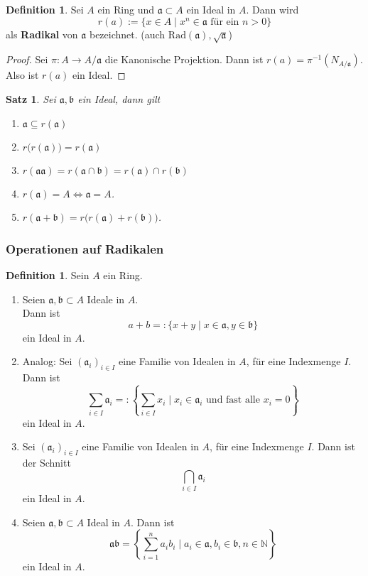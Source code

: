 \documentclass[10pt,a4paper]{article}
\newcommand{\N}{\ensuremath{\mathbb{N}}}
\theoremstyle{plain}
\newtheorem{satz}[theorem]{Satz}
\theoremstyle{definition}
\newtheorem{definition}[theorem]{Definition}
\theoremstyle{remark}
\begin{document}
	\begin{definition}
		Sei $A$ ein Ring und $\mathfrak a\subset A$ ein Ideal in $A$. Dann wird
		\[r(a):=\{x\in A\mid \text{$x^n\in \mathfrak a$ für ein $n>0$}\}\]
		als \textbf{Radikal} von $\mathfrak a$ bezeichnet. (auch $\mathrm{Rad}(\mathfrak a),\sqrt{\mathfrak a}$)
	\end{definition}
	\begin{proof}
		Sei $\pi:A\to A/\mathfrak a$ die Kanonische Projektion. Dann ist $r(a)=\pi^{-1}\left(N_{A/\mathfrak a}\right)$.\\
		Also ist $r(a)$ ein Ideal.
	\end{proof}
	
	\begin{satz}
		Sei $\mathfrak a,\mathfrak b$ ein Ideal, dann gilt
		\begin{enumerate}
			\item $\mathfrak a\subseteq r(\mathfrak a)$
			\item $r\big(r(\mathfrak a)\big)=r(\mathfrak a)$
			\item $r(\mathfrak a\mathfrak a)=r(\mathfrak a\cap \mathfrak b)=r(\mathfrak a)\cap r(\mathfrak b)$
			\item $r(\mathfrak a)=A\Leftrightarrow\mathfrak a=A$.
			\item $r(\mathfrak a+\mathfrak b)=r\big(r(\mathfrak a)+r(\mathfrak b)\big)$.
		\end{enumerate}
	\end{satz}

	\subsubsection{Operationen auf Radikalen}
	\begin{definition}
		Sein $A$ ein Ring.
		\begin{enumerate}
			\item Seien $\mathfrak a,\mathfrak b\subset A$ Ideale in $A$.\\
			Dann ist
			\[a+b=:\{x+y\mid x\in\mathfrak{a},y\in\mathfrak{b}\}\]
			ein Ideal in $A$.
			\item Analog: Sei $(\mathfrak{a}_i)_{i\in I}$ eine Familie von Idealen in $A$, für eine Indexmenge $I$. Dann ist
			\[\sum_{i\in I}\mathfrak{a}_i=:\left\{\sum_{i\in I}x_i\mid \text{$x_i\in \mathfrak{a}_i$ und fast alle $x_i=0$}\right\}\]
			ein Ideal in $A$.
			\item Sei $(\mathfrak{a}_i)_{i\in I}$ eine Familie von Idealen in $A$, für eine Indexmenge $I$. Dann ist der Schnitt
			\[\bigcap_{i\in I}\mathfrak a_i\]
			ein Ideal in $A$.
			\item Seien $\mathfrak a,\mathfrak b\subset A$ Ideal in $A$. Dann ist
			\[\mathfrak a\mathfrak b=\left\{\sum_{i=1}^{n}a_ib_i\mid a_i\in\mathfrak a,b_i\in\mathfrak b,n\in\N\right\}\] 
			ein Ideal in $A$.
		\end{enumerate}
	\end{definition}
\end{document}
